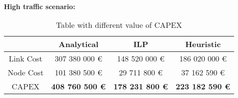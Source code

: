 \vspace{11pt}
\textbf{High traffic scenario:}\\

\begin{table}[h!]
\centering
\begin{tabular}{| c | c | c | c |}
 \hline
   & Analytical & ILP & Heuristic \\
 \hline\hline
 Link Cost & 307 380 000 \euro & 148 520 000 \euro & 186 020 000 \euro \\
 Node Cost & 101 380 500 \euro & 29 711 800 \euro & 37 162 590 \euro \\
 CAPEX & \textbf{408 760 500 \euro} & \textbf{178 231 800 \euro} & \textbf{223 182 590 \euro} \\
 \hline
\end{tabular}
\caption{Table with different value of CAPEX }
\label{table_comparative_opaque_sur_ref_3}
\end{table}

